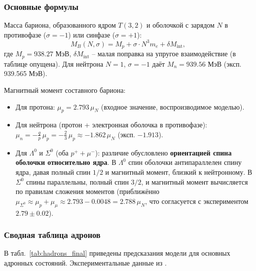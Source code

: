 \documentclass[11pt,a4paper]{article}
\begin{document}
\subsubsection{Основные формулы}
Масса бариона, образованного ядром $T(3,2)$ и оболочкой с зарядом $N$ в противофазе ($\sigma=-1$) или синфазе ($\sigma=+1$):
\begin{equation}
M_{B}(N,\sigma) = M_p + \sigma\cdot N^3 m_e + \delta M_{\text{int}},
\end{equation}
где $M_p = 938.27$ МэВ, $\delta M_{\text{int}}$ – малая поправка на упругое взаимодействие (в таблице опущена). Для нейтрона $N=1$, $\sigma=-1$ даёт $M_n = 939.56$ МэВ (эксп. 939.565 МэВ).

Магнитный момент составного бариона:
\begin{itemize}
\item Для протона: $\mu_p = 2.793\,\mu_N$ (входное значение, воспроизводимое моделью).
\item Для нейтрона (протон + электронная оболочка в противофазе): $\mu_n = -\frac{q}{p}\,\mu_p = -\frac{2}{3}\,\mu_p \approx -1.862\,\mu_N$ (эксп. $-1.913$).
\item Для $\Lambda^0$ и $\Sigma^0$ (оба $p^+ + \mu^-$): различие обусловлено \textbf{ориентацией спина оболочки относительно ядра}. В $\Lambda^0$ спин оболочки антипараллелен спину ядра, давая полный спин $1/2$ и магнитный момент, близкий к нейтронному. В $\Sigma^0$ спины параллельны, полный спин $3/2$, и магнитный момент вычисляется по правилам сложения моментов (приближённо $\mu_{\Sigma^0} \approx \mu_p + \mu_\mu \approx 2.793 - 0.0048 = 2.788\,\mu_N$, что согласуется с экспериментом $2.79\pm0.02$).
\end{itemize}

\subsubsection{Сводная таблица адронов}
В табл.~\ref{tab:hadrons_final} приведены предсказания модели для основных адронных состояний. Экспериментальные данные из \cite{PDG:2024}.
\end{document}
